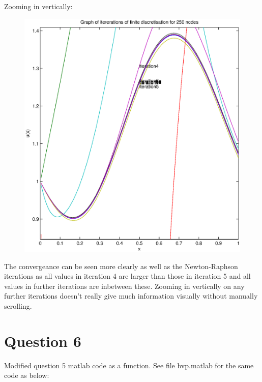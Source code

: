 \documentclass[fleqn]{report}
\begin{document}
Zooming in vertically: 
\begin{figure}[h!]
\begin{center}
    \centerline{\includegraphics[width=1.1\textwidth]{graphs/q5g2.eps}}
\end{center}
\end{figure}

The convergeance can be seen more clearly as well
as the Newton-Raphson iterations as all values in iteration 4 are larger
than those in iteration 5 and all values in further iterations are inbetween these. 
Zooming in vertically on any further iterations doesn't really give
much information visually without manually scrolling.

\newpage
\section{Question 6}

Modified question 5 matlab code as a function. See file bvp.matlab for
the same code as below:

\end{document}
